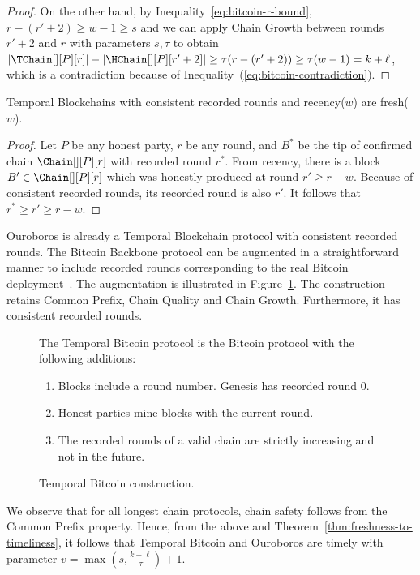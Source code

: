 \begin{proof}
  On the other hand, by Inequality~\ref{eq:bitcoin-r-bound}, $r - (r' + 2) \geq w - 1 \geq s$ and
  we can apply Chain Growth between rounds $r' + 2$ and $r$
  with parameters $s, \tau$ to obtain
  $|\TChain[][P][r]| - |\HChain[][P][r' + 2]| \geq \tau(r - (r' + 2)) \geq \tau (w - 1) =  k + \ell$,
  which is a contradiction because of Inequality~(\ref{eq:bitcoin-contradiction}).
  \Qed
\end{proof}

\begin{theorem}\label{thm.longest-chain-freshness}
  Temporal Blockchains with consistent recorded rounds and recency($w$) are fresh($w$).
\end{theorem}
\begin{proof}
  Let $P$ be any honest party, $r$ be any round, and
  $B^*$ be the tip of confirmed chain $\Chain[][P][r]$ with recorded round $r^*$.
  From recency, there is a block $B' \in \Chain[][P][r]$ which was
  honestly produced at round $r' \geq r - w$.
  Because of consistent recorded rounds, its recorded round is also $r'$.
  It follows that $r^* \geq r' \geq r - w$.
  \Qed
\end{proof}

Ouroboros is already a Temporal Blockchain protocol with consistent recorded rounds.
The Bitcoin Backbone protocol can be augmented in a
straightforward manner to include recorded rounds
corresponding to the real Bitcoin deployment~\cite{mastering-bitcoin}.
The augmentation is illustrated in Figure~\ref{fig.temporal-backbone}.
The construction retains Common Prefix, Chain Quality and Chain Growth.
Furthermore, it has consistent recorded rounds.

\begin{figure}
  \begin{mdframed}
    The Temporal Bitcoin protocol is the Bitcoin protocol with
    the following additions:

    \begin{enumerate}
      \item Blocks include a round number. Genesis has recorded round $0$.
      \item Honest parties mine blocks with the current round.
      \item The recorded rounds of a valid chain are strictly increasing and not in the future.
    \end{enumerate}
  \end{mdframed}
  \caption{Temporal Bitcoin construction.}
  \label{fig.temporal-backbone}
\end{figure}

We observe that for all longest chain protocols, chain safety follows from the
Common Prefix property. Hence, from the above and Theorem~\ref{thm:freshness-to-timeliness},
it follows that Temporal Bitcoin and
Ouroboros are timely with parameter $v = \max(s, \frac{k + \ell}{\tau}) + 1$.
